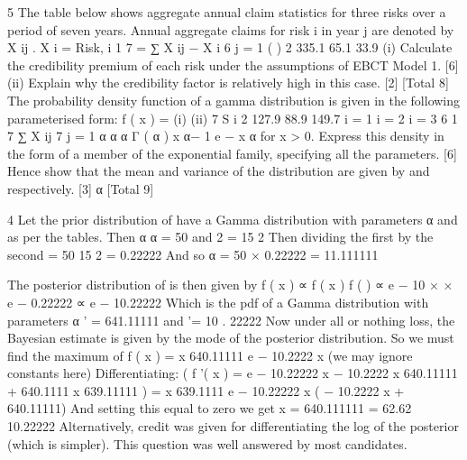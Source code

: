 \documentclass[a4paper,12pt]{article}
\begin{document}
 
5
The table below shows aggregate annual claim statistics for three risks over a period
of seven years. Annual aggregate claims for risk i in year j are denoted by X ij .
X i =
Risk, i
1 7
= ∑ X ij − X i
6 j = 1
(
)
2
335.1
65.1
33.9
(i) Calculate the credibility premium of each risk under the assumptions of EBCT
Model 1.
[6]
(ii) Explain why the credibility factor is relatively high in this case.
[2]
[Total 8]
The probability density function of a gamma distribution is given in the following
parameterised form:
f ( x ) =
(i)
(ii)
7
S i 2
127.9
88.9
149.7
i = 1
i = 2
i = 3
6
1 7
∑ X ij
7 j = 1
α α
\mu  α Γ ( α )
x
α− 1
e
−
x α
\mu 
for x > 0.
Express this density in the form of a member of the exponential family,
specifying all the parameters.
[6]
Hence show that the mean and variance of the distribution are given by \mu  and
respectively.
[3]
α
[Total 9]

\newpage

4
Let the prior distribution of \mu  have a Gamma distribution with parameters α and \lambda 
as per the tables.
Then
α
α
= 50 and 2 = 15 2
\lambda 
\lambda 
Then dividing the first by the second \lambda  =
50
15 2
= 0.22222
And so α = 50 × 0.22222 = 11.111111


The posterior distribution of \mu  is then given by
f ( \mu  x ) ∝ f ( x \mu  ) f ( \mu  )
∝ e − 10 \mu  × × e − 0.22222 \mu 
∝  e − 10.22222 \mu 
Which is the pdf of a Gamma distribution with parameters α ' = 641.11111 and
\lambda  '= 10 . 22222
Now under all or nothing loss, the Bayesian estimate is given by the mode of the
posterior distribution. So we must find the maximum of
f ( x ) = x 640.11111 e − 10.2222 x (we may ignore constants here)
Differentiating:
(
f '( x ) = e − 10.22222 x − 10.2222 x 640.11111 + 640.1111 x 639.11111
)
= x 639.1111 e − 10.22222 x ( − 10.2222 x + 640.11111)
And setting this equal to zero we get
x =
640.111111
= 62.62
10.22222
Alternatively, credit was given for differentiating the log of the posterior (which is simpler).
This question was well answered by most candidates.
\end{document}
